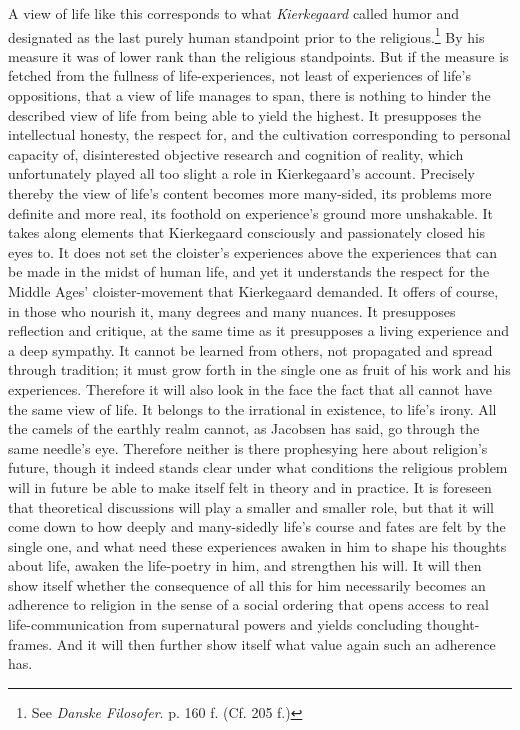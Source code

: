 \documentclass[12pt,a4paper]{book}
\newcommand{\opage}[1]{\marginnote{\footnotesize\textit{[#1]}}}
\begin{document}
A view of life like this corresponds to what \emph{Kierkegaard} called humor and designated as the
last purely human standpoint prior to the religious.\footnote{See \emph{Danske Filosofer}. p. 160 f.
(Cf. 205 f.)} By his measure it was of lower rank than the religious standpoints. But if the measure is
fetched from the fullness of life-experiences, not least of experiences of life's oppositions, that a
view of life manages to span, there is nothing to hinder the described view of life from being able to
yield the highest. It presupposes the intellectual honesty, the respect for, and the cultivation corresponding to personal capacity of, disinterested objective research and cognition of reality, which
unfortunately played all too slight a role in Kierkegaard's account. Precisely thereby the view of
life's content becomes more many-sided, its problems more definite and more real, its foothold on
experience's ground more unshakable. It takes along elements that Kierkegaard consciously and
passionately closed his eyes to. It does not set the cloister's experiences above the experiences that
can be made in the midst of human life, and yet it understands the respect for the Middle Ages'
cloister-movement that Kierkegaard demanded. It \opage{379}offers of course, in those who nourish it, many degrees
and many nuances. It presupposes reflection and critique, at the same time as it presupposes a living
experience and a deep sympathy. It cannot be learned from others, not propagated and spread through
tradition; it must grow forth in the single one as fruit of his work and his experiences. Therefore it
will also look in the face the fact that all cannot have the same view of life. It belongs to the
irrational in existence, to life's irony. All the camels of the earthly realm cannot, as Jacobsen has
said, go through the same needle's eye. Therefore neither is there prophesying here about religion's future,
though it indeed stands clear under what conditions the religious problem will in future be able to make
itself felt in theory and in practice. It is foreseen that theoretical discussions will play a smaller
and smaller role, but that it will come down to how deeply and many-sidedly life's course and fates are
felt by the single one, and what need these experiences awaken in him to shape his thoughts about life,
awaken the life-poetry in him, and strengthen his will. It will then show itself whether the consequence
of all this for him necessarily becomes an adherence to religion in the sense of a social ordering that
opens access to real life-communication from supernatural powers and yields concluding thought-frames.
And it will then further show itself what value again such an adherence has.
\end{document}
